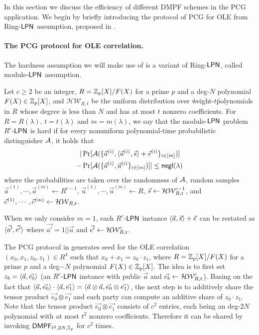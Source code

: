 In this section we discuss the efficiency of different DMPF schemes in the PCG application. We begin by briefly introducing the protocol of PCG for OLE from Ring-${\sf LPN}$ assumption, proposed in \cite{cryptoeprint:2022/1035}. 

\paragraph{The PCG protocol for OLE correlation.}The hardness assumption we will make use of is a variant of Ring-${\sf LPN}$, called module-${\sf LPN}$ assumption. 
\begin{definition}\label{def:module-LPN}
    Let $c\ge 2$ be an integer, $R = \mathbb{Z}_p[X]/F(X)$ for a prime $p$ and a deg-$N$ polynomial $F(X)\in \mathbb{Z}_p[X]$, and $\mathcal{HW}_{R,t}$ be the uniform distribution over \`weight-$t$\' polynomials in $R$ whose degree is less than $N$ and has at most $t$ nonzero coefficients. 
     For $R=R(\lambda)$, $t=t(\lambda)$ and $m=m(\lambda)$, we say that the module-${\sf LPN}$ problem $R^c$-${\sf LPN}$ is hard if for every nonuniform polynomial-time probabilistic distinguisher $\mathcal{A}$, it holds that 
    \begin{align*}
        |&\Pr[\mathcal{A}(\{\vec{a}^{(i)}, \langle \vec{a}^{(i)}, \vec{s} \rangle+\vec{e}^{(i)}\}_{i\in [m]})] \\
        -&\Pr[\mathcal{A}(\{\vec{a}^{(i)},\vec{u}^{(i)}\}_{i\in [m]})]| \le \mathsf{negl}(\lambda)
    \end{align*}
    where the probabilities are taken over the randomness of $\mathcal{A}$, random samples $\vec{a}^{(1)},\cdots, \vec{a}^{(m)}\leftarrow R^{c-1}$, $\vec{u}^{(1)},\cdots, \vec{u}^{(m)}\leftarrow R$, $\vec{s}\leftarrow \mathcal{HW}_{R,t}^{c-1}$, and $\vec{e}^{(1)},\cdots, \vec{e}^{(m)}\leftarrow \mathcal{HW}_{R,t}$. 

    When we only consider $m=1$, each $R^c$-${\sf LPN}$ instance $ \langle \vec{a}, \vec{s} \rangle+\vec{e}$ can be restated as $\langle \vec{a'}, \vec{e'} \rangle$ where $\vec{a'}=1||\vec{a}$ and $\vec{e'}\leftarrow \mathcal{HW}_{R,t}^c$. 
\end{definition}

The PCG protocol in \cite{cryptoeprint:2022/1035} generates seed for the OLE correlation $(x_0,x_1,z_0,z_1)\in R^4$ such that $x_0+x_1 = z_0\cdot z_1$, where $R = \mathbb{Z}_p[X]/F(X)$ for a prime $p$ and a deg$-N$ polynomial $F(X)\in \mathbb{Z}_p[X]$. The idea is to first set $z_b = \langle \vec{a}, \vec{e_b} \rangle$ (an $R^c$-${\sf LPN}$ instance with public $\vec{a}$ and $\vec{e_b}\leftarrow \mathcal{HW}_{R,t}^c$). Basing on the fact that $\langle \vec{a},  \vec{e_0} \rangle\cdot \langle \vec{a}, \vec{e_1} \rangle = \langle \vec{a}\otimes \vec{a}, \vec{e_0}\otimes \vec{e_1} \rangle$, the next step is to additively share the tensor product $\vec{e_0}\otimes \vec{e_1}$ and each party can compute an additive share of $z_0\cdot z_1$. Note that the tensor product $\vec{e_0}\otimes\vec{e_1}$ consists of $c^2$ entries, each being an deg-$2N$ polynomial with at most ${t}^2$ nonzero coefficients. Therefore it can be shared by invoking ${\sf DMPF}_{{t}^2, 2N, \mathbb{Z}_p}$ for $c^2$ times.

